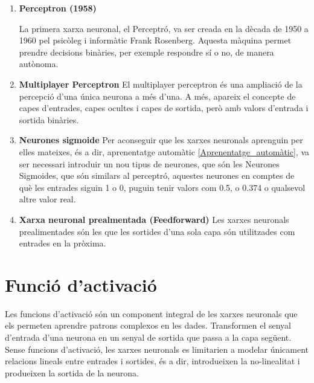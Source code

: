 \begin{enumerate}
    \item \textbf{Perceptron (1958)}

    La primera xarxa neuronal, el Perceptró, va ser creada en la dècada de 1950 a 1960 pel psicòleg i informàtic Frank Rosenberg. Aquesta màquina permet prendre decisions binàries, per exemple respondre sí o no, de manera autònoma. \\
    \item \textbf{Multiplayer Perceptron}
    El multiplayer perceptron és una ampliació de la percepció d'una única neurona a més d'una. A més, apareix el concepte de capes d'entrades, capes ocultes i capes de sortida, però amb valors d'entrada i sortida binàries.\\
    \item \textbf{Neurones sigmoide}
    Per aconseguir que les xarxes neuronals aprenguin per elles mateixes, és a dir, aprenentatge automàtic \ref{Aprenentatge_automàtic}, va ser necessari introduir un nou tipus de neurones, que són les Neurones Sigmoides, que són similars al perceptró, aquestes neurones en comptes de què les entrades siguin 1 o 0, puguin tenir valors com 0.5, o 0.374 o qualsevol altre valor real.\\


    \item \textbf{Xarxa neuronal prealmentada (Feedforward)}
    Les xarxes neuronals prealimentades són les que les sortides d'una sola capa són utilitzades com entrades en la pròxima.
\end{enumerate}

\section{
Funció d'activació}\label{Activació}
Les funcions d'activació són un component integral de les xarxes neuronals que els permeten aprendre patrons complexos en les dades. Transformen el senyal d'entrada d'una neurona en un senyal de sortida que passa a la capa següent. Sense funcions d'activació, les xarxes neuronals es limitarien a modelar únicament relacions lineals entre entrades i sortides, és a dir, introdueixen la no-linealitat i produeixen la sortida de la neurona.


